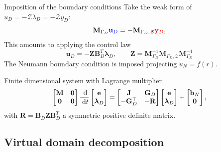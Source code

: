 \documentclass[aspectratio=169]{ISAE-Beamer}
\begin{document}
\begin{frame}{Imposition of the boundary conditions}
	Take the weak form of $u_D=-\mathcal{Z}\lambda_D=-\mathcal{Z}y_D$:
	\[ \mathbf{M}_{\Gamma_D} \textcolor{blue}{\mathbf{u}_D} = - \mathbf{M}_{\Gamma_D, \mathcal{Z}} \textcolor{red}{\mathbf{y}_D},
	\]
	This amounts to applying the control law
	\[ \mathbf{u}_D  = -\mathbf{Z} \mathbf{B}_D^T \bm{\lambda}_D, \qquad \mathbf{Z} = \mathbf{M}_{\Gamma_D}^{-1} \mathbf{M}_{\Gamma_D, \mathcal{Z}} \mathbf{M}_{\Gamma_D}^{-1}
	\]
	The Neumann boundary condition is imposed projecting $u_N = f(r)$. 
	\begin{block}{Finite dimensional system with Lagrange multiplier}
	\begin{equation*}
	\label{eq:sys_dae}
	\begin{bmatrix}
	\mathbf{M} & \mathbf{0} \\
	\mathbf{0} & \mathbf{0} \\
	\end{bmatrix} \frac{\d}{\d t}
	\begin{bmatrix}
	\mathbf{e}\\
	\bm{\lambda}_D \\
	\end{bmatrix}
	= \begin{bmatrix}
	\mathbf{J} & \mathbf{G}_D\\
	-\mathbf{G}_D^\top & -\mathbf{R} \\
	\end{bmatrix}
	\begin{bmatrix}
	\mathbf{e}\\
	\bm{\lambda}_D \\
	\end{bmatrix} + \begin{bmatrix}
	\mathbf{b}_N \\
	\mathbf{0} \\
	\end{bmatrix},
	\end{equation*}
	with $\mathbf{R} = \mathbf{B}_D \mathbf{Z} \mathbf{B}_D^T$ a symmetric positive definite matrix. 
	\end{block}
	
\end{frame}

\subsection{Virtual domain decomposition}
\end{document}
